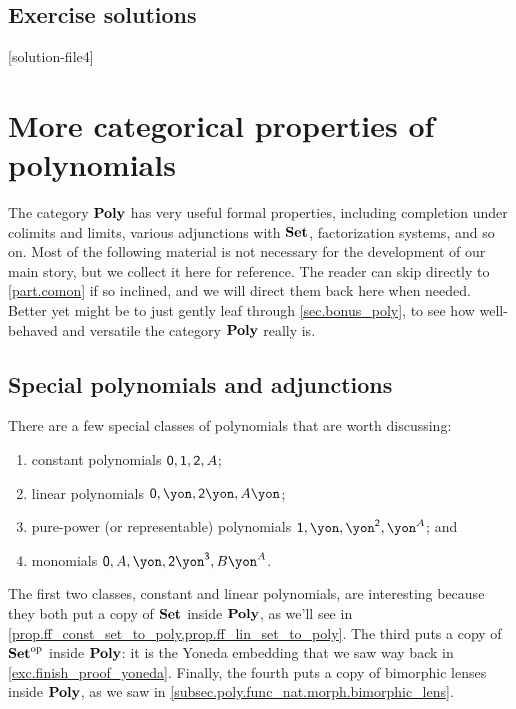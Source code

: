 \documentclass[Book-Poly]{subfiles}
\begin{document}
\section{Exercise solutions}
{\footnotesize
}

[solution-file4]

\chapter{More categorical properties of polynomials} \label{ch.poly.bonus}

The category $\mathbf{Poly}$ has very useful formal properties, including completion under colimits and limits, various adjunctions with $\mathbf{Set}$, factorization systems, and so on. Most of the following material is not necessary for the development of our main story, but we collect it here for reference. The reader can skip directly to \cref{part.comon} if so inclined, and we will direct them back here when needed. Better yet might be to just gently leaf through \cref{sec.bonus_poly}, to see how well-behaved and versatile the category $\mathbf{Poly}$ really is.

\section{Special polynomials and adjunctions}

There are a few special classes of polynomials that are worth discussing: 
\begin{enumerate}[label=\alph*)]
	\item constant polynomials $\textsf{0},\textsf{1},\textsf{2},A$; 
	\item linear polynomials $\0,\yon, \2\yon, A\yon$;
	\item pure-power (or representable) polynomials $\1, \yon, \yon^\2, \yon^A$; and 
	\item monomials $\0, A, \yon, \2\yon^\3, B\yon^A$.
\end{enumerate}
The first two classes, constant and linear polynomials, are interesting because they both put a copy of $\mathbf{Set}$ inside $\mathbf{Poly}$, as we'll see in \cref{prop.ff_const_set_to_poly,prop.ff_lin_set_to_poly}. 
The third puts a copy of $\mathbf{Set}^{\textnormal{op}}$ inside $\mathbf{Poly}$: it is the Yoneda embedding that we saw way back in \cref{exc.finish_proof_yoneda}.
Finally, the fourth puts a copy of bimorphic lenses inside $\mathbf{Poly}$, as we saw in \cref{subsec.poly.func_nat.morph.bimorphic_lens}.
\end{document}
